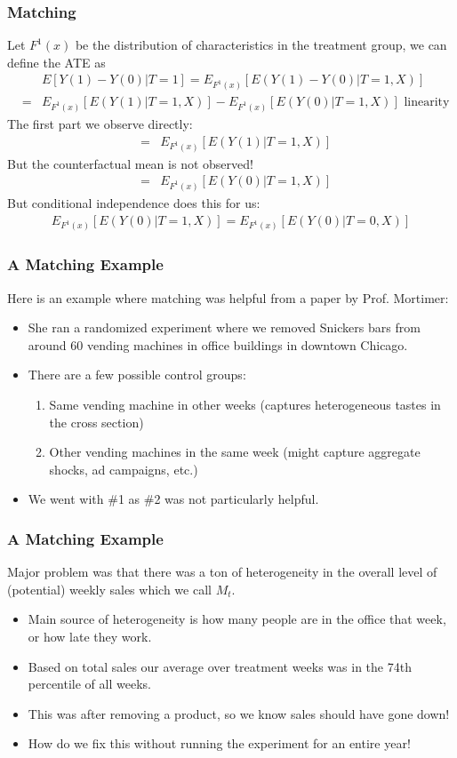 \begin{frame}
\frametitle{Matching}
Let  $F^{1}(x)$ be the distribution of characteristics in the treatment group, we can define the ATE as 
\begin{eqnarray*}
&&E[Y(1) - Y(0) | T =1] = E_{F^1(x)} [E(Y(1) -Y(0) | T=1,X)] \\
&=&  E_{F^1(x)} [E(Y(1) | T=1,X)] -  E_{F^1(x)} [E(Y(0) | T=1,X)] \mbox{ linearity } 
\end{eqnarray*}
The first part we observe directly:
\begin{eqnarray*}
&=&  E_{F^1(x)} [E(Y(1) | T=1,X)] 
\end{eqnarray*}
But the counterfactual mean is not observed!
\begin{eqnarray*}
&=&  E_{F^1(x)} [E(Y(0) | T=1,X)] 
\end{eqnarray*}
But conditional independence does this for us:
\begin{eqnarray*}
 E_{F^1(x)} [E(Y(0) | T=1,X)]  =  E_{F^1(x)} [E(Y(0) | T=0,X)] 
\end{eqnarray*}
\end{frame}

\begin{frame}
\frametitle{A Matching Example}
Here is an example where matching was helpful from a paper by Prof. Mortimer:
\begin{itemize}
\item She ran a randomized experiment where we removed Snickers bars from around 60 vending machines in office buildings in downtown Chicago.
\item There are a few possible control groups:
\begin{enumerate}
\item Same vending machine in other weeks (captures heterogeneous tastes in the cross section)
\item Other vending machines in the same week (might capture aggregate shocks, ad campaigns, etc.)
\end{enumerate}
\item We went with \#1 as \#2 was not particularly helpful.
\end{itemize}
\end{frame}

\begin{frame}
\frametitle{A Matching Example}
Major problem was that there was a ton of heterogeneity in the overall level of (potential) weekly sales which we call $M_t$.
\begin{itemize}
\item Main source of heterogeneity is how many people are in the office that week, or how late they work.
\item Based on total sales our average over treatment weeks was in the 74th percentile of all weeks.
\item This was after removing a product, so we know sales should have gone down!
\item How do we fix this without running the experiment for an entire year!
\end{itemize}
\end{frame}

